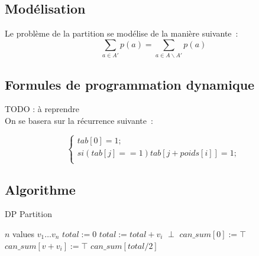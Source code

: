 \subsection{Modélisation}

Le problème de la partition se modélise de la manière suivante~:
\begin{equation}
\sum_{a \in A'} p(a)= \sum_{a \in A
    \backslash A'}p(a)
\end{equation}

\subsection{Formules de programmation dynamique}

TODO : à reprendre \\

On se basera sur la récurrence suivante~:

\begin{equation}
\begin{cases}
tab[0] = 1; \\
si ( tab[j] == 1 ) {
       tab[j + poids[i]] = 1;
     } \\
\end{cases}
\end{equation}

\subsection{Algorithme}

\begin{algorithm}[!ht]
\caption{DP Partition}
\label{dp_partition}
\begin{algorithmic}[1]
\REQUIRE $n$ values $v_1 \dots v_n$
\STATE $total := 0$
	\STATE $total := total + v_i$
\ENDFOR
{}
	\RETURN $\perp$
\ENDIF
\STATE $can\_sum[0] := \top$ 
			\STATE $can\_sum[v + v_i] := \top$
		\ENDIF
	\ENDFOR
\ENDFOR
\RETURN $can\_sum[total/2]$
\end{algorithmic}
\end{algorithm}

